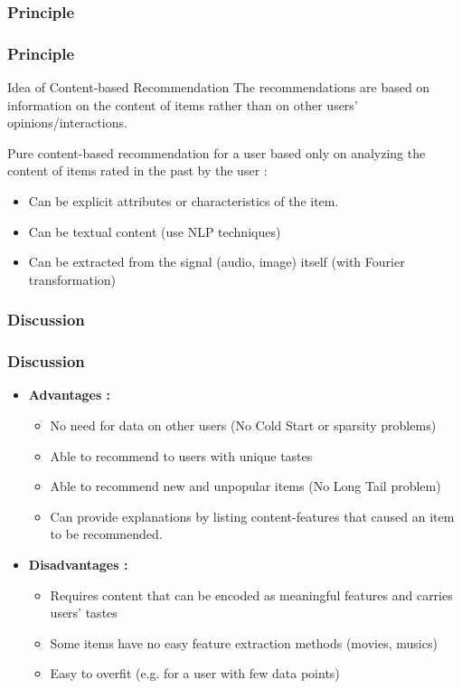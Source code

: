 \documentclass[10pt,handout,english]{beamer}
\begin{document}
			\subsubsection{Principle}
			\begin{frame}
			\frametitle{Principle}
				\begin{block}{Idea of Content-based Recommendation}
					The recommendations are based on information on the content of items rather than on other users' opinions/interactions.
				\end{block}

				Pure content-based recommendation for a user based only on analyzing the content of items rated in the past by the user :
				\begin{itemize}
					\item Can be explicit attributes or characteristics of the item.
					\item Can be textual content (use NLP techniques)
					\item Can be extracted from the signal (audio, image) itself (with Fourier transformation)
				\end{itemize}

			\end{frame}

			\subsubsection{Discussion}
			\begin{frame}
			\frametitle{Discussion}
				\begin{itemize}
					\item \textbf{Advantages :}
						\begin{itemize}
							\item No need for data on other users (No Cold Start or sparsity problems)
							\item Able to recommend to users with unique tastes
							\item Able to recommend new and unpopular items (No Long Tail problem)
							\item Can provide explanations by listing content-features that caused an item to be recommended.
						\end{itemize}
					\item \textbf{Disadvantages :}
						\begin{itemize}
							\item Requires content that can be encoded as meaningful features and carries users' tastes
							\item Some items have no easy feature extraction methods (movies, musics)
							\item Easy to overfit (e.g. for a user with few data points)
						\end{itemize}
				\end{itemize}
			\end{frame}
\end{document}
